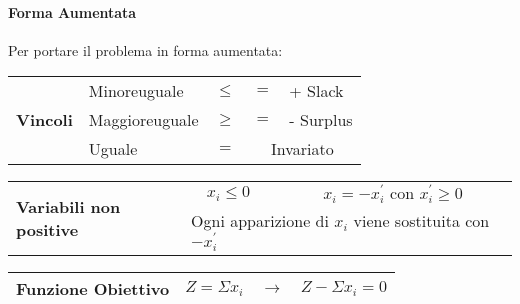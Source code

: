 \documentclass[12pt, a4paper, openany]{book}
\begin{document}
\paragraph{Forma Aumentata} Per portare il problema in forma aumentata:\\
\begin{tabularx}{\textwidth}{|X|lc|c|l|}
	\hline
	\multirow{3}{*}{\textbf{Vincoli}} & Minoreuguale   & $\leq$ & $ = $                          & + Slack   \\
	\cline{2-5}
	                                  & Maggioreuguale & $\geq$ & $ =$                           & - Surplus \\
	\cline{2-5}
	                                  & Uguale         & $=$    & \multicolumn{2}{c|}{Invariato}             \\
	\hline
\end{tabularx}
\begin{tabularx}{\textwidth}{|X|c|c|}
	\hline
	\multirow{2}{*}{\textbf{Variabili non positive}} & $x_i\leq 0$                                                                     & $ x_i = -x_i^{'} \text{ con } x_i^{'}\geq 0 $ \\
	\cline{2-3}
	                                                 & \multicolumn{2}{|l|}{Ogni apparizione di $x_i$ viene sostituita con $-x_i^{'}$}                                                 \\
	\hline
\end{tabularx}
\begin{tabularx}{\textwidth}{|X|ccc|}
	\hline

	\textbf{Funzione Obiettivo} & $Z = \Sigma x_i $ & $\to$ & $ Z - \Sigma x_i = 0$ \\
	\hline
\end{tabularx}
\end{document}
